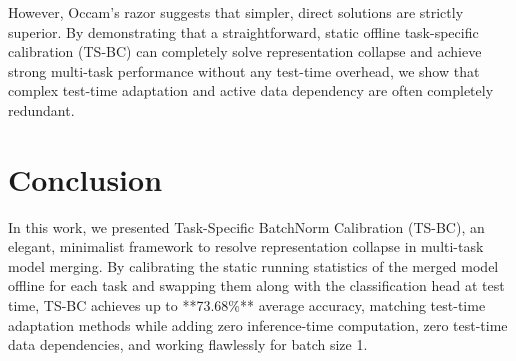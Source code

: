 \documentclass{article}
\theoremstyle{plain}
\theoremstyle{definition}
\theoremstyle{remark}
\begin{document}
However, Occam's razor suggests that simpler, direct solutions are strictly superior. By demonstrating that a straightforward, static offline task-specific calibration (TS-BC) can completely solve representation collapse and achieve strong multi-task performance without any test-time overhead, we show that complex test-time adaptation and active data dependency are often completely redundant.

\section{Conclusion}
In this work, we presented Task-Specific BatchNorm Calibration (TS-BC), an elegant, minimalist framework to resolve representation collapse in multi-task model merging. By calibrating the static running statistics of the merged model offline for each task and swapping them along with the classification head at test time, TS-BC achieves up to **73.68\%** average accuracy, matching test-time adaptation methods while adding zero inference-time computation, zero test-time data dependencies, and working flawlessly for batch size 1.



\end{document}
